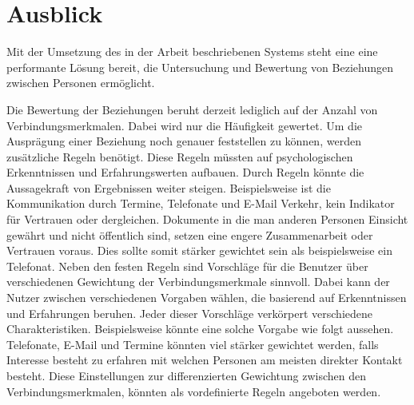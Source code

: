 \section{Ausblick}
\label{ch:Ergebnis:sec:Ausblick}

Mit der Umsetzung des in der Arbeit beschriebenen Systems steht eine eine performante Lösung bereit, die Untersuchung und Bewertung von Beziehungen zwischen Personen ermöglicht.

Die Bewertung der Beziehungen beruht derzeit lediglich auf der Anzahl von Verbindungsmerkmalen. Dabei wird nur die Häufigkeit gewertet. Um die Ausprägung einer Beziehung noch genauer feststellen zu können, werden zusätzliche Regeln benötigt. Diese Regeln müssten auf psychologischen Erkenntnissen und Erfahrungswerten aufbauen. Durch Regeln könnte die Aussagekraft von Ergebnissen weiter steigen. Beispielsweise ist die Kommunikation durch Termine, Telefonate und E-Mail Verkehr, kein Indikator für Vertrauen oder dergleichen. Dokumente in die man anderen Personen Einsicht gewährt und nicht öffentlich sind, setzen eine engere Zusammenarbeit oder Vertrauen voraus. Dies sollte somit stärker gewichtet sein als beispielsweise ein Telefonat. Neben den festen Regeln sind Vorschläge für die Benutzer über verschiedenen Gewichtung der Verbindungsmerkmale sinnvoll. Dabei kann der Nutzer zwischen verschiedenen Vorgaben wählen, die basierend auf Erkenntnissen und Erfahrungen beruhen. Jeder dieser Vorschläge verkörpert verschiedene Charakteristiken. Beispielsweise könnte eine solche Vorgabe wie folgt aussehen. Telefonate, E-Mail und Termine könnten viel stärker gewichtet werden, falls Interesse besteht zu erfahren mit welchen Personen am meisten direkter Kontakt besteht. Diese Einstellungen zur differenzierten Gewichtung zwischen den Verbindungsmerkmalen, könnten als vordefinierte Regeln angeboten werden.

